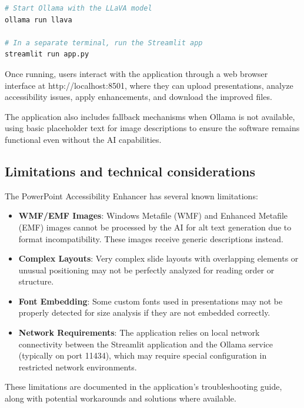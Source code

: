 \documentclass[preprint,review,12pt]{elsarticle} %
\begin{document}
\begin{lstlisting}[language=bash, caption=Manual startup process]
# Start Ollama with the LLaVA model
ollama run llava

# In a separate terminal, run the Streamlit app
streamlit run app.py
\end{lstlisting}

Once running, users interact with the application through a web browser interface at http://localhost:8501, where they can upload presentations, analyze accessibility issues, apply enhancements, and download the improved files.

The application also includes fallback mechanisms when Ollama is not available, using basic placeholder text for image descriptions to ensure the software remains functional even without the AI capabilities.

\subsection{Limitations and technical considerations}
The PowerPoint Accessibility Enhancer has several known limitations:

\begin{itemize}
    \item \textbf{WMF/EMF Images}: Windows Metafile (WMF) and Enhanced Metafile (EMF) images cannot be processed by the AI for alt text generation due to format incompatibility. These images receive generic descriptions instead.
    
    \item \textbf{Complex Layouts}: Very complex slide layouts with overlapping elements or unusual positioning may not be perfectly analyzed for reading order or structure.
    
    \item \textbf{Font Embedding}: Some custom fonts used in presentations may not be properly detected for size analysis if they are not embedded correctly.
    
    \item \textbf{Network Requirements}: The application relies on local network connectivity between the Streamlit application and the Ollama service (typically on port 11434), which may require special configuration in restricted network environments.
\end{itemize}

These limitations are documented in the application's troubleshooting guide, along with potential workarounds and solutions where available.
\end{document}
